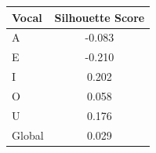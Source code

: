 \begin{tabular}{lc}
\toprule
\rowcolor{col01}
Vocal & Silhouette Score \\
\midrule
A & -0.083 \\
E & -0.210 \\
I & 0.202 \\
O & 0.058 \\
U & 0.176 \\
Global & 0.029 \\
\bottomrule
\end{tabular}
